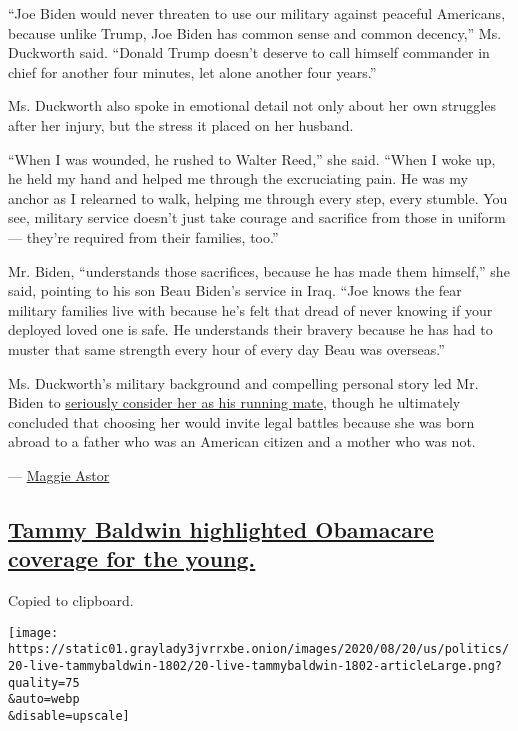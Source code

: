 ``Joe Biden would never threaten to use our military against peaceful
Americans, because unlike Trump, Joe Biden has common sense and common
decency,'' Ms. Duckworth said. ``Donald Trump doesn't deserve to call
himself commander in chief for another four minutes, let alone another
four years.''

Ms. Duckworth also spoke in emotional detail not only about her own
struggles after her injury, but the stress it placed on her husband.

``When I was wounded, he rushed to Walter Reed,'' she said. ``When I
woke up, he held my hand and helped me through the excruciating pain. He
was my anchor as I relearned to walk, helping me through every step,
every stumble. You see, military service doesn't just take courage and
sacrifice from those in uniform --- they're required from their
families, too.''

Mr. Biden, ``understands those sacrifices, because he has made them
himself,'' she said, pointing to his son Beau Biden's service in Iraq.
``Joe knows the fear military families live with because he's felt that
dread of never knowing if your deployed loved one is safe. He
understands their bravery because he has had to muster that same
strength every hour of every day Beau was overseas.''

Ms. Duckworth's military background and compelling personal story led
Mr. Biden to
\href{https://www.nytimes3xbfgragh.onion/2020/08/01/us/politics/tammy-duckworth-biden-vp.html}{seriously
consider her as his running mate}, though he ultimately concluded that
choosing her would invite legal battles because she was born abroad to a
father who was an American citizen and a mother who was not.

--- \href{https://www.nytimes3xbfgragh.onion/by/maggie-astor}{Maggie
Astor}

\hypertarget{tammy-baldwin-highlighted-obamacare-coverage-for-the-young}{%
\subsection{\texorpdfstring{\protect\hyperlink{tammy-baldwin-highlighted-obamacare-coverage-for-the-young}{Tammy
Baldwin highlighted Obamacare coverage for the
young.}}{Tammy Baldwin highlighted Obamacare coverage for the young.}}\label{tammy-baldwin-highlighted-obamacare-coverage-for-the-young}}

Copied to clipboard.

\texttt{[image: https://static01.graylady3jvrrxbe.onion/images/2020/08/20/us/politics/20-live-tammybaldwin-1802/20-live-tammybaldwin-1802-articleLarge.png?quality=75\\\&auto=webp\\\&disable=upscale]}

